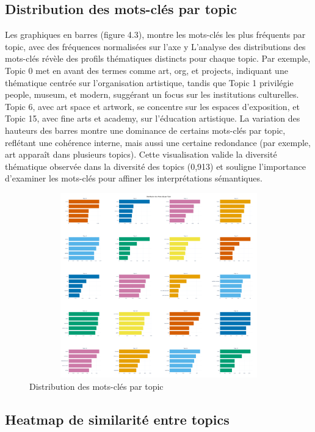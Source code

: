 \documentclass[mstat,12pt]{unswthesis}
\begin{document}
\subsection{Distribution des mots-clés par topic}


Les graphiques en barres (figure 4.3), montre les mots-clés les plus fréquents par topic, avec 
des fréquences normalisées sur l’axe y 
L’analyse des distributions des mots-clés révèle des profils thématiques distincts pour chaque 
topic. Par exemple, Topic 0 met en avant des termes comme art, org, et projects, indiquant 
une thématique centrée sur l’organisation artistique, tandis que Topic 1 privilégie people, 
museum, et modern, suggérant un focus sur les institutions culturelles. Topic 6, avec art 
space et artwork, se concentre sur les espaces d’exposition, et Topic 15, avec fine arts et 
academy, sur l’éducation artistique. La variation des hauteurs des barres montre une 
dominance de certains mots-clés par topic, reflétant une cohérence interne, mais aussi une 
certaine redondance (par exemple, art apparaît dans plusieurs topics). Cette visualisation 
valide la diversité thématique observée dans la diversité des topics (0,913) et souligne 
l’importance d’examiner les mots-clés pour affiner les interprétations sémantiques.


\begin{figure}[H]
    \centering
    \includegraphics[width=15cm,height=8cm]{distributions.png}
    \caption{Distribution des mots-clés par topic }
    \label{fig:enquete}
\end{figure}

\subsection{ Heatmap de similarité entre topics}
\end{document}
